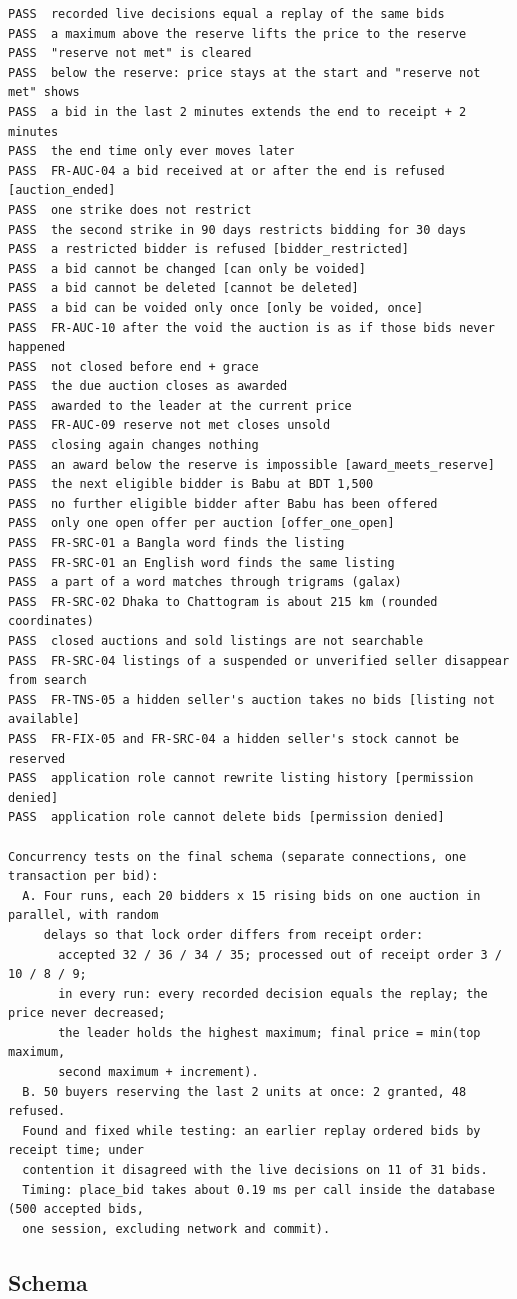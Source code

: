 \documentclass[11pt,a4paper]{article}
\begin{document}
{\begin{verbatim}
PASS  recorded live decisions equal a replay of the same bids
PASS  a maximum above the reserve lifts the price to the reserve
PASS  "reserve not met" is cleared
PASS  below the reserve: price stays at the start and "reserve not met" shows
PASS  a bid in the last 2 minutes extends the end to receipt + 2 minutes
PASS  the end time only ever moves later
PASS  FR-AUC-04 a bid received at or after the end is refused [auction_ended]
PASS  one strike does not restrict
PASS  the second strike in 90 days restricts bidding for 30 days
PASS  a restricted bidder is refused [bidder_restricted]
PASS  a bid cannot be changed [can only be voided]
PASS  a bid cannot be deleted [cannot be deleted]
PASS  a bid can be voided only once [only be voided, once]
PASS  FR-AUC-10 after the void the auction is as if those bids never happened
PASS  not closed before end + grace
PASS  the due auction closes as awarded
PASS  awarded to the leader at the current price
PASS  FR-AUC-09 reserve not met closes unsold
PASS  closing again changes nothing
PASS  an award below the reserve is impossible [award_meets_reserve]
PASS  the next eligible bidder is Babu at BDT 1,500
PASS  no further eligible bidder after Babu has been offered
PASS  only one open offer per auction [offer_one_open]
PASS  FR-SRC-01 a Bangla word finds the listing
PASS  FR-SRC-01 an English word finds the same listing
PASS  a part of a word matches through trigrams (galax)
PASS  FR-SRC-02 Dhaka to Chattogram is about 215 km (rounded coordinates)
PASS  closed auctions and sold listings are not searchable
PASS  FR-SRC-04 listings of a suspended or unverified seller disappear from search
PASS  FR-TNS-05 a hidden seller's auction takes no bids [listing not available]
PASS  FR-FIX-05 and FR-SRC-04 a hidden seller's stock cannot be reserved
PASS  application role cannot rewrite listing history [permission denied]
PASS  application role cannot delete bids [permission denied]

Concurrency tests on the final schema (separate connections, one transaction per bid):
  A. Four runs, each 20 bidders x 15 rising bids on one auction in parallel, with random
     delays so that lock order differs from receipt order:
       accepted 32 / 36 / 34 / 35; processed out of receipt order 3 / 10 / 8 / 9;
       in every run: every recorded decision equals the replay; the price never decreased;
       the leader holds the highest maximum; final price = min(top maximum,
       second maximum + increment).
  B. 50 buyers reserving the last 2 units at once: 2 granted, 48 refused.
  Found and fixed while testing: an earlier replay ordered bids by receipt time; under
  contention it disagreed with the live decisions on 11 of 31 bids.
  Timing: place_bid takes about 0.19 ms per call inside the database (500 accepted bids,
  one session, excluding network and commit).
\end{verbatim}
}

\subsection{Schema}

\end{document}
